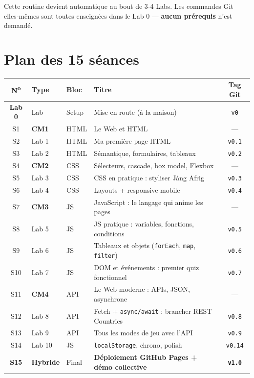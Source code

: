 \documentclass[11pt,a4paper]{article}
\begin{document}
Cette routine devient automatique au bout de 3-4 Labs. Les commandes Git
elles-mêmes sont toutes enseignées dans le Lab 0 --- \textbf{aucun prérequis}
n'est demandé.

\newpage

\section{Plan des 15 séances}

\begin{center}
\begin{tabular}{clllc}
\toprule
\textbf{N\textsuperscript{o}} & \textbf{Type} & \textbf{Bloc} & \textbf{Titre} & \textbf{Tag Git} \\
\midrule
\textbf{Lab 0} & Lab & Setup & Mise en route (à la maison) & \texttt{v0} \\
\midrule
S1   & \textbf{CM1}   & HTML & Le Web et HTML                                      & --- \\
S2   & Lab 1          & HTML & Ma première page HTML                               & \texttt{v0.1} \\
S3   & Lab 2          & HTML & Sémantique, formulaires, tableaux                   & \texttt{v0.2} \\
\midrule
S4   & \textbf{CM2}   & CSS  & Sélecteurs, cascade, box model, Flexbox             & --- \\
S5   & Lab 3          & CSS  & CSS en pratique : styliser Jàng Afrig                & \texttt{v0.3} \\
S6   & Lab 4          & CSS  & Layouts + responsive mobile                          & \texttt{v0.4} \\
\midrule
S7   & \textbf{CM3}   & JS   & JavaScript : le langage qui anime les pages         & --- \\
S8   & Lab 5          & JS   & JS pratique : variables, fonctions, conditions      & \texttt{v0.5} \\
S9   & Lab 6          & JS   & Tableaux et objets (\texttt{forEach}, \texttt{map}, \texttt{filter}) & \texttt{v0.6} \\
S10  & Lab 7          & JS   & DOM et événements : premier quiz fonctionnel        & \texttt{v0.7} \\
\midrule
S11  & \textbf{CM4}   & API  & Le Web moderne : APIs, JSON, asynchrone             & --- \\
S12  & Lab 8          & API  & Fetch + \texttt{async/await} : brancher REST Countries & \texttt{v0.8} \\
S13  & Lab 9          & API  & Tous les modes de jeu avec l'API                    & \texttt{v0.9} \\
S14  & Lab 10         & JS   & \texttt{localStorage}, chrono, polish               & \texttt{v0.14} \\
\midrule
\textbf{S15} & \textbf{Hybride} & Final & \textbf{Déploiement GitHub Pages + démo collective} & \textbf{\texttt{v1.0}} \\
\bottomrule
\end{tabular}
\end{center}
\end{document}
